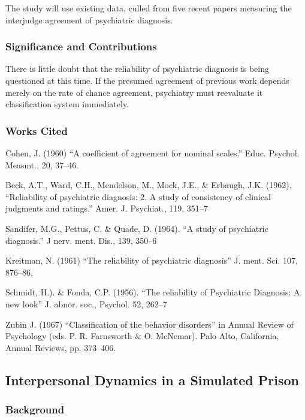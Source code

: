 \begin{refsection}
The study will use existing data, culled from five recent papers measuring the interjudge agreement of psychiatric diagnosis.

\subsubsection{Significance and Contributions}
\label{significanceandcontributions}

There is little doubt that the reliability of psychiatric diagnosis is being questioned at this time. If the presumed agreement of previous work depends merely on the rate of chance agreement, psychiatry must reevaluate it classification system immediately.

\subsubsection{Works Cited}
\label{workscited}

Cohen, J. (1960) ``A coefficient of agreement for nominal scales.'' Educ. Psychol. Measmt., 20, 37--46.

Beck, A.T., Ward, C.H., Mendelson, M., Mock, J.E., \& Erbaugh, J.K. (1962). ``Reliability of psychiatric diagnosis: 2. A study of consistency of clinical judgments and ratings.'' Amer. J. Psychiat., 119, 351--7

Sandifer, M.G., Pettus, C. \& Quade, D. (1964). ``A study of psychiatric diagnosis.'' J nerv. ment. Dis., 139, 350--6

Kreitman, N. (1961) ``The reliability of psychiatric diagnosis'' J. ment. Sci. 107, 876--86.

Schmidt, H.). \& Fonda, C.P. (1956). ``The reliability of Psychiatric Diagnosis: A new look'' J. abnor. soc., Psychol. 52, 262--7

Zubin J. (1967) ``Classification of the behavior disorders'' in Annual Review of Psychology (eds. P. R. Farnsworth \& O. McNemar). Palo Alto, California, Annual Reviews, pp. 373--406.

\newpage

\subsection{Interpersonal Dynamics in a Simulated Prison}
\label{interpersonaldynamicsinasimulatedprison}

\subsubsection{Background}
\label{background}


\end{refsection}

